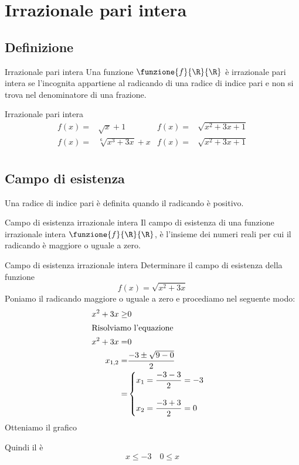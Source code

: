 \section{Irrazionale pari intera}
\subsection{Definizione}
\begin{definizionet}{Irrazionale pari intera}{}
	Una funzione $\funzione{f}{\R}{\R}$ è irrazionale pari intera se l'incognita appartiene al radicando di una radice di indice pari e  non si trova nel denominatore di una frazione.
\end{definizionet}
\begin{esempiot}{Irrazionale pari intera}{}
\begin{align*}
f(x)=&\sqrt{x}+1&f(x)=&\sqrt{x^2+3x+1}\\
f(x)=&\sqrt[6]{x^3+3x}+x&f(x)=&\sqrt{x^2+3x+1}\\
\end{align*}
\end{esempiot}
\subsection{Campo di esistenza}
Una radice di indice pari è definita quando il radicando è positivo.  
\begin{definizionet}{Campo di esistenza irrazionale intera}{}
	Il campo di esistenza  di una funzione irrazionale intera $\funzione{f}{\R}{\R}$, è  l'insieme dei numeri reali per cui il radicando è maggiore o uguale a  zero.
\end{definizionet} 
\begin{esempiot}{Campo di esistenza irrazionale intera}{}
Determinare il campo di esistenza della funzione\[f(x)=\sqrt{x^2+3x}\]Poniamo il radicando maggiore o uguale a zero e procediamo nel seguente modo:
\begin{align*}
x^2+3x\geq& 0\\
\intertext{Risolviamo l'equazione}
x^2+3x=& 0\\
x_{1,2}=&\dfrac{-3\pm\sqrt{9-0}}{2}\\
=&\begin{cases}
x_1=\dfrac{-3-3}{2}=-3\\
\\
x_2=\dfrac{-3+3}{2}=0\\
\end{cases}
\end{align*}
Otteniamo il grafico
\begin{center}

\end{center}
Quindi il 	è
\[x\leq -3\quad 0\leq x\]
\end{esempiot}
